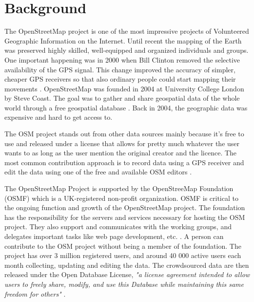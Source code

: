 \documentclass[12pt, a4paper]{report}   	%
\begin{document}
\chapter{Background}
The OpenStreetMap project is one of the most impressive projects of Volunteered Geographic Information on the Internet\cite{Neis2012}. Until recent the mapping of the Earth was preserved highly skilled, well-equipped and organized individuals and groups. One important happening was in 2000 when Bill Clinton removed the selective availability of the GPS signal. This change improved the accuracy of simpler, cheaper GPS receivers so that also ordinary people could start mapping their movements \cite{Weber2008}. OpenStreetMap was founded in 2004 at University College London by Steve Coast. The goal was to gather and share geospatial data of the whole world through a free geospatial database \cite{Neis2012}. Back in 2004, the geographic data was expensive and hard to get access to. 

The OSM project stands out from other data sources mainly because it's free to use and released under a license that allows for pretty much whatever the user wants to as long as the user mention the original creator and the licence\cite{Chilton}.  The most common contribution approach is to record data using a GPS receiver and edit the data using one of the free and available OSM editors \cite{Neis2012}.  

The OpenStreetMap Project is supported by the OpenStreeMap Foundation (OSMF) which is a UK-registered non-profit organization. OSMF is critical to the ongoing function and growth of the OpenStreetMap project. The foundation has the responsibility for the servers and services necessary for hosting the OSM project. They also support and communicates with the working groups, and delegates important tasks like web page development, etc. \cite{OSMF}. A person can contribute to the OSM project without being a member of the foundation. The project has over 3 million registered users, and around 40 000 active users each month \cite{ OSMstats2016} collecting, updating and editing the data. The crowdsourced data are then released under the Open Database License, \textit{"a license agreement intended to allow users to freely share, modify, and use this Database while maintaining this same freedom for others"} \cite{ODbL}. 
\end{document}
